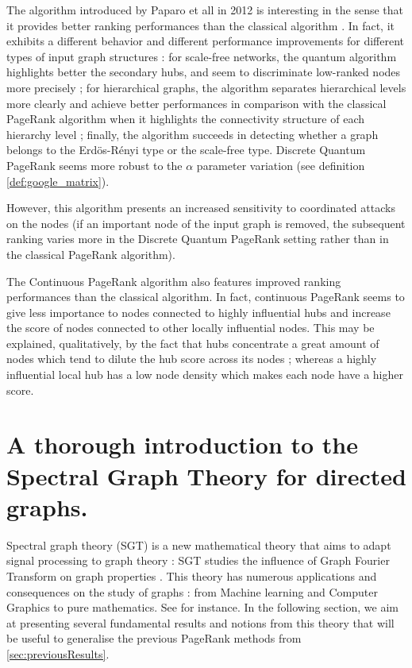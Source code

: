 \documentclass[sn-mathphys]{sn-jnl}%
\theoremstyle{thmstyleone}%
\theoremstyle{thmstyletwo}%
\theoremstyle{thmstylethree}%
\begin{document}
The algorithm introduced by Paparo et all in 2012 is interesting in
the sense that it provides better ranking performances than the
classical algorithm \cite{paparo_martin-delgado_2012,
  paparo_muller_comellas_martin-delgado_2013, paparo_2014}. In fact,
it exhibits a different behavior and different performance
improvements for different types of input graph structures : for
scale-free networks, the quantum algorithm highlights better the
secondary hubs, and seem to discriminate low-ranked nodes more
precisely ; for hierarchical graphs, the algorithm separates
hierarchical levels more clearly and achieve better performances in
comparison with the classical PageRank algorithm when it highlights
the connectivity structure of each hierarchy level ; finally, the
algorithm succeeds in detecting whether a graph belongs to the
Erdös-Rényi type or the scale-free type. Discrete Quantum PageRank
seems more robust to the $\alpha$ parameter variation (see definition
\ref{def:google_matrix}).

However, this algorithm presents an increased sensitivity to
coordinated attacks on the nodes (if an important node of the input
graph is removed, the subsequent ranking varies more in the Discrete
Quantum PageRank setting rather than in the classical PageRank
algorithm).

The Continuous PageRank algorithm
\cite{sanchez-burillo_duch_gomez-gardenes_zueco_2012} also features
improved ranking performances than the classical algorithm. In fact,
continuous PageRank seems to give less importance to nodes connected
to highly influential hubs and increase the score of nodes connected
to other locally influential nodes. This may be explained,
qualitatively, by the fact that hubs concentrate a great amount of
nodes which tend to dilute the hub score across its nodes ; whereas a
highly influential local hub has a low node density which makes each
node have a higher score.

\section{A thorough introduction to the Spectral Graph Theory for directed graphs.}
\label{sec:SGTIntro}

Spectral graph theory (SGT) is a new mathematical theory that aims to
adapt signal processing to graph theory : SGT studies the influence of
Graph Fourier Transform on graph properties
\cite{shuman_narang_frossard_ortega_vandergheynst_2013}. This theory
has numerous applications and consequences on the study of graphs :
from Machine learning and Computer Graphics to pure mathematics. See
\cite{chung_1997,
  ricaud_borgnat_tremblay_goncalves_vandergheynst_2019,
  shuman_narang_frossard_ortega_vandergheynst_2013, sevi2019} for
instance. In the following section, we aim at presenting several
fundamental results and notions from this theory that will be useful
to generalise the previous PageRank methods from
\ref{sec:previousResults}.
\end{document}
